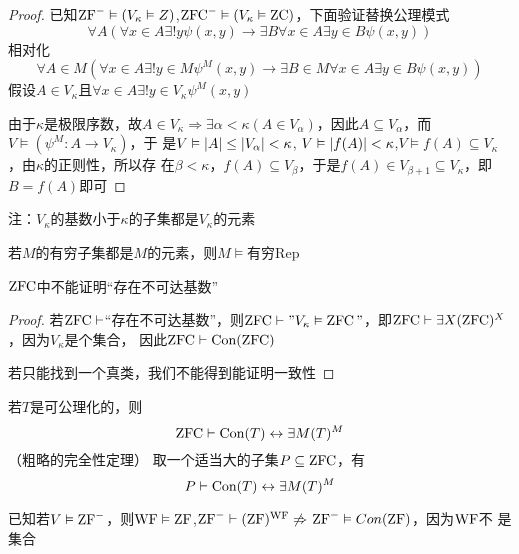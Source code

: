 \documentclass[11pt]{article}
\def \ZC {\text{ZC}}
\begin{document}
\begin{proof}
已知\(\text{ZF}^-\vDash(V_\kappa\vDash Z)\),\(\ZFCm\vDash(V_\kappa\vDash\ZC)\)，下面验证替换公理模式
\begin{equation*}
\forall A(\forall x\in A\exists!y\psi(x,y)\to\exists B\forall x\in A\exists y\in B\psi(x,y))
\end{equation*}
相对化
\begin{equation*}
\forall A\in M(\forall x\in A\exists!y\in M\psi^M(x,y)\to\exists B\in M\forall x\in A\exists y\in B\psi(x,y))
\end{equation*}
假设\(A\in V_\kappa\)且\(\forall x\in A\exists!y\in V_\kappa\psi^M(x,y)\)

由于\(\kappa\)是极限序数，故\(A\in V_\kappa\Rightarrow\exists\alpha<\kappa(A\in V_\alpha)\)，因此\(A\subseteq V_\alpha\)，而\(V\vDash(\psi^M:A\to V_\kappa)\)，于
是\(V\vDash\abs{A}\le\abs{V_\alpha}<\kappa\), \(V\vDash\abs{f(A)}<\kappa\),\(V\vDash f(A)\subseteq V_\kappa\)，由\(\kappa\)的正则性，所以存
在\(\beta<\kappa\)，\(f(A)\subseteq V_\beta\)，于是\(f(A)\in V_{\beta+1}\subseteq V_\kappa\)，即\(B=f(A)\)即可
\end{proof}

注：\(V_\kappa\)的基数小于\(\kappa\)的子集都是\(V_\kappa\)的元素

若\(M\)的有穷子集都是\(M\)的元素，则\(M\vDash\)有穷Rep

\begin{corollary}[]
\(\operatorname{ZFC}\)中不能证明“存在不可达基数”
\end{corollary}

\begin{proof}
若\(\operatorname{ZFC}\vdash\)“存在不可达基数”，则\(\operatorname{ZFC}\vdash"V_\kappa\vDash\operatorname{ZFC}"\)，即\(\operatorname{ZFC}\vdash\exists X(\operatorname{ZFC})^X\)，因为\(V_\kappa\)是个集合，
因此\(\operatorname{ZFC}\vdash\text{Con}(\operatorname{ZFC})\)

若只能找到一个真类，我们不能得到能证明一致性
\end{proof}

若\(T\)是可公理化的，则
\begin{equation*}
\operatorname{ZFC}\vdash\text{Con}(T)\leftrightarrow\exists M(T)^M
\end{equation*}
（粗略的完全性定理）
取一个适当大的子集\(P\subseteq\operatorname{ZFC}\)，有
\begin{equation*}
P\vdash\text{Con}(T)\leftrightarrow\exists M(T)^M
\end{equation*}

已知若\(V\vDash\text{ZF}^-\)，则\(\operatorname{WF}\vDash\operatorname{ZF}\),\(\text{ZF}^-\vdash(\operatorname{ZF})^{\operatorname{WF}} \not\Rightarrow\) \(\text{ZF}^-\vDash Con(\operatorname{ZF})\)，因为\(\operatorname{WF}\)不
是集合
\end{document}
